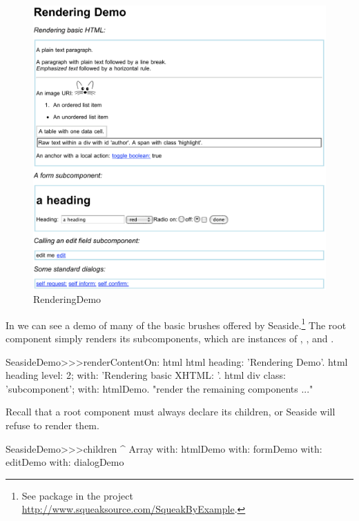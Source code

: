 \documentclass[a4paper,10pt,twoside]{book}
\begin{document}
\begin{figure}[ht]
\begin{center}
\includegraphics[width=\textwidth]{RenderingDemo}
\caption{RenderingDemo}
\label{fig:RenderingDemo}
\end{center}
\end{figure}

In  we can see a demo of many of the basic brushes offered by Seaside.\footnote{See package  in the project \url{http://www.squeaksource.com/SqueakByExample}.}
The root component  simply renders its subcomponents, which are instances of , ,  and .

\begin{code}{}
SeasideDemo>>>renderContentOn: html
	html heading: 'Rendering Demo'.
	html heading
		level: 2;
		with: 'Rendering basic XHTML: '.
	html div
		class: 'subcomponent';
		with: htmlDemo.
	"render the remaining components ..."
\end{code}

Recall that a root component must always declare its children, or Seaside will refuse to render them.
\begin{code}{}
SeasideDemo>>>children
	^ Array with: htmlDemo with: formDemo with: editDemo with: dialogDemo
\end{code}
\end{document}
